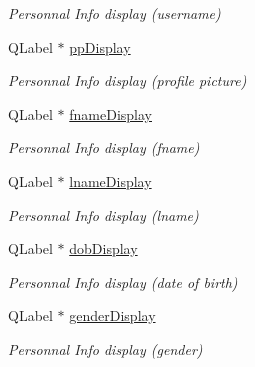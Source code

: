 \begin{DoxyCompactItemize}
\begin{DoxyCompactList}\small\item\em Personnal Info display (username) \end{DoxyCompactList}\item 
\hypertarget{classmenuWidget_a8cd4ce21bfe9e2a56007fa10c9608e61}{Q\-Label $\ast$ \hyperlink{classmenuWidget_a8cd4ce21bfe9e2a56007fa10c9608e61}{pp\-Display}}\label{classmenuWidget_a8cd4ce21bfe9e2a56007fa10c9608e61}

\begin{DoxyCompactList}\small\item\em Personnal Info display (profile picture) \end{DoxyCompactList}\item 
\hypertarget{classmenuWidget_a42d73a5bb37694647f87b1f69a228bdf}{Q\-Label $\ast$ \hyperlink{classmenuWidget_a42d73a5bb37694647f87b1f69a228bdf}{fname\-Display}}\label{classmenuWidget_a42d73a5bb37694647f87b1f69a228bdf}

\begin{DoxyCompactList}\small\item\em Personnal Info display (fname) \end{DoxyCompactList}\item 
\hypertarget{classmenuWidget_ace67a6270206012fabfbc25dd45462cc}{Q\-Label $\ast$ \hyperlink{classmenuWidget_ace67a6270206012fabfbc25dd45462cc}{lname\-Display}}\label{classmenuWidget_ace67a6270206012fabfbc25dd45462cc}

\begin{DoxyCompactList}\small\item\em Personnal Info display (lname) \end{DoxyCompactList}\item 
\hypertarget{classmenuWidget_ae5ea9f8351e5d3a183db41f9188ebf59}{Q\-Label $\ast$ \hyperlink{classmenuWidget_ae5ea9f8351e5d3a183db41f9188ebf59}{dob\-Display}}\label{classmenuWidget_ae5ea9f8351e5d3a183db41f9188ebf59}

\begin{DoxyCompactList}\small\item\em Personnal Info display (date of birth) \end{DoxyCompactList}\item 
\hypertarget{classmenuWidget_a93cd84fff79f557fca1cc33cd3485a3a}{Q\-Label $\ast$ \hyperlink{classmenuWidget_a93cd84fff79f557fca1cc33cd3485a3a}{gender\-Display}}\label{classmenuWidget_a93cd84fff79f557fca1cc33cd3485a3a}

\begin{DoxyCompactList}\small\item\em Personnal Info display (gender) \end{DoxyCompactList}\end{DoxyCompactItemize}


